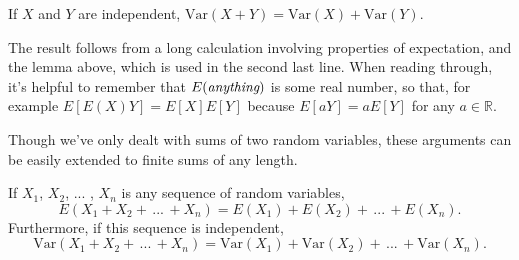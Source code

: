 \begin{thm}\label{VarianceIndependentSum} If $X$ and $Y$ are independent, $\text{Var}(X+Y) = \text{Var}(X) + \text{Var}(Y)$.
\end{thm}
\begin{pf} The result follows from a long calculation involving properties of expectation, and the lemma above, which is used in the second last line. When reading through, it's helpful to remember that $E(\emph{anything})$ is some real number, so that, for example $E[E(X)Y] = E[X]E[Y]$ because $E[aY] = aE[Y]$ for any $a \in \mathbb{R}$.
\end{pf}

Though we've only dealt with sums of two random variables, these arguments can be easily extended to finite sums of any length.

\begin{cor}\label{expectationandvarianceofindependentsum}If $X_1$, $X_2$, ... , $X_n$ is any sequence of random variables,
$$E(X_1 + X_2 + \, ... \, + X_n) = E(X_1) + E(X_2) + \, ... \, + E(X_n).$$
Furthermore, if this sequence is independent,
$$\text{Var}(X_1 + X_2 + \, ... \, + X_n) = \text{Var}(X_1) + \text{Var}(X_2) + \, ... \, + \text{Var}(X_n).$$
\end{cor}


